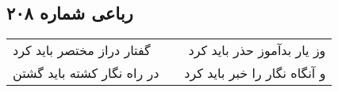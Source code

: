 \begin{center}
\section*{رباعی شماره ۲۰۸}
\label{sec:sh208}
\begin{longtable}{l p{0.5cm} r}
گفتار دراز مختصر باید کرد
&&
وز یار بدآموز حذر باید کرد
\\
در راه نگار کشته باید گشتن
&&
و آنگاه نگار را خبر باید کرد
\\
\end{longtable}
\end{center}
